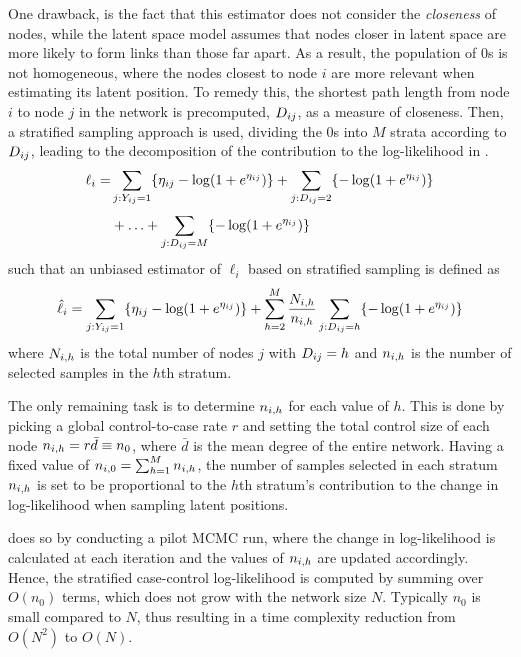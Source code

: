 One drawback, is the fact that this estimator does not consider the \emph{closeness} of nodes, while the latent space model assumes that nodes closer in latent space are more likely to form links than those far apart. As a result, the population of 0s is not homogeneous, where the nodes closest to node $i$ are more relevant when estimating its latent position. To remedy this, the shortest path length from node $i$ to node $j$ in the network is precomputed, $\sub(D)$, as a measure of closeness. Then, a stratified sampling approach is used, dividing the 0s into $M$ strata according to $\sub(D)$, leading to the decomposition of the contribution to the log-likelihood in .
\begin{equation}
\label{eq:case-stratified-likelihood}
    \setlength{\jot}{0.5\baselineskip}
    \begin{split}
        \ell_i = & \sum_{j:\sub(Y)=1} \{\sub(\eta)-\log(1+e^{\sub(\eta)}) \} + \sum_{j:\sub(D)=2} \{-\log(1+e^{\sub(\eta)}) \} \\
                 & + \ldots + \sum_{j:\sub(D)=M} \{-\log(1+e^{\sub(\eta)}) \}
    \end{split}
\end{equation}
such that an unbiased estimator of $\ell_i$ based on stratified sampling is defined as
\begin{equation}
\label{eq:case-stratified-estimate}
    \hat{\ell}_i = \sum_{j:\sub(Y)=1} \{\sub(\eta)-\log(1+e^{\sub(\eta)}) \} + \sum_{h=2}^M \frac{\sub(N)(i,h)}{\sub(n)(i,h)} \sum_{j:\sub(D)=h} \{-\log(1+e^{\sub(\eta)}) \}
\end{equation}
where $\sub(N)(i,h)$ is the total number of nodes $j$ with $\sub(D)=h$ and $\sub(n)(i,h)$ is the number of selected samples in the $h$th stratum.

The only remaining task is to determine $\sub(n)(i,h)$ for each value of $h$. 
This is done by picking a global control-to-case rate $r$ and setting the total control size of each node $\sub(n)(i,h)=r\bar{d}\equiv n_0$, where $\bar{d}$ is the mean degree of the entire network. Having a fixed value of $\sub(n)(i,0)=\sum_{h=1}^M\sub(n)(i,h)$, the number of samples selected in each stratum $\sub(n)(i,h)$ is set to be proportional to the $h$th stratum's contribution to the change in log-likelihood when sampling latent positions.

\citeauthor{raftery2012fast} does so by conducting a pilot MCMC run, where the change in log-likelihood is calculated at each iteration and the values of $\sub(n)(i,h)$ are updated accordingly. Hence, the stratified case-control log-likelihood is computed by summing over $O(n_0)$ terms, which does not grow with the network size $N$. Typically $n_0$ is small compared to $N$, thus resulting in a time complexity reduction from $O(N^2)$ to $O(N)$.


